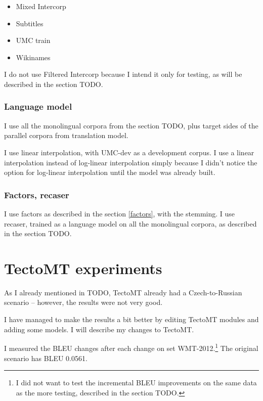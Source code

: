 \begin{itemize}
\item Mixed Intercorp
\item Subtitles
\item UMC train
\item Wikinames
\end{itemize}

I do not use Filtered Intercorp because I intend it only for testing, as will be described in the section TODO.

\subsubsection{Language model}

I use all the monolingual corpora from the section TODO, plus target sides of the parallel corpora from translation model.

I use linear interpolation, with UMC-dev as a development corpus. I use a linear interpolation instead of log-linear interpolation simply because I didn't notice the option for log-linear interpolation until the model was already built.

\subsubsection{Factors, recaser}
I use factors as described in the section \ref{factors}, with the  stemming. I use recaser, trained as a language model on all the monolingual corpora, as described in the section TODO.


\section{TectoMT experiments}
As I already mentioned in TODO, TectoMT already had a Czech-to-Russian scenario -- however, the results were not very good.

I have managed to make the results a bit better by editing TectoMT modules and adding some models. I will describe my changes to TectoMT.

I measured the BLEU changes after each change on  set WMT-2012.\footnote{I did not want to test the incremental BLEU improvements on the same data as the more  testing, described in the section TODO.}
The original scenario has BLEU 0.0561.


